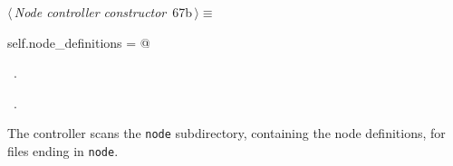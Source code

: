 \documentclass[
    a4paper,      %
    10pt,         %
    openright,    %
    notitlepage,  %
    parskip=half, %
]{scrreprt}       %
\theoremstyle{definition}                    %
\begin{document}
\begin{flushleft} \small
\begin{minipage}{\linewidth}\label{scrap113}\raggedright\small
{} $\langle\,${\itshape Node controller constructor}\nobreak\ {\footnotesize {67b}}$\,\rangle\equiv$
\vspace{-1exm}
\begin{list}{}{} \item
\mbox{}\lstinline@    self.node_definitions = {}@{\NWsep}
\end{list}
\vspace{-1.5ex}
\footnotesize
\begin{list}{}{\setlength{\itemsep}{-\parsep}\setlength{\itemindent}{-\leftmargin}}
\item \NWtxtMacroDefBy\ .
\item \NWtxtMacroRefIn\ .

\item{}
\end{list}
\end{minipage}\vspace{4ex}
\end{flushleft}
The controller scans the \verb+node+ subdirectory, containing the node
definitions, for files ending in \verb+node+.
\end{document}
